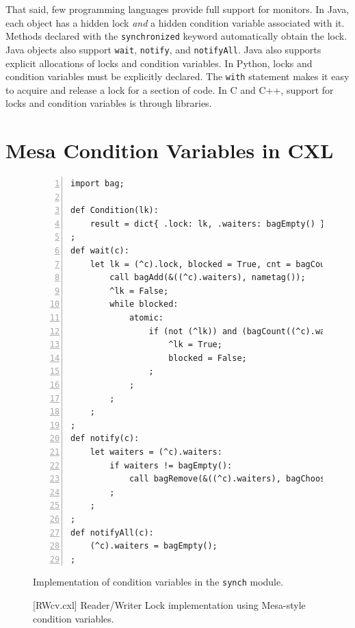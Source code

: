 \documentclass{report}
\newenvironment{code}{
\tcolorbox
}{
\endtcolorbox
}
\begin{document}
That said, few programming languages provide full support for monitors.
In Java, each object has a hidden lock \emph{and} a hidden condition variable
associated with it.
Methods declared with the \texttt{synchronized} keyword automatically
obtain the lock.  Java objects also support \texttt{wait}, \texttt{notify},
and \texttt{notifyAll}.  Java also supports explicit allocations of locks
and condition variables.
In Python, locks and condition variables must be explicitly declared.
The \texttt{with} statement makes it easy to acquire and release a lock
for a section of code.
In C and C++, support for locks and condition variables is through libraries.

\chapter{Mesa Condition Variables in CXL}
\label{ch:mesa}

\begin{figure}
\begin{code}
\begin{Verbatim}[xleftmargin=5mm,numbers=left]
import bag;

def Condition(lk):
    result = dict{ .lock: lk, .waiters: bagEmpty() };
;
def wait(c):
    let lk = (^c).lock, blocked = True, cnt = bagCount((^c).waiters, nametag()):
        call bagAdd(&((^c).waiters), nametag());
        ^lk = False;
        while blocked:
            atomic:
                if (not (^lk)) and (bagCount((^c).waiters, nametag()) <= cnt):
                    ^lk = True;
                    blocked = False;
                ;
            ;
        ;
    ;
;
def notify(c):
    let waiters = (^c).waiters:
        if waiters != bagEmpty():
            call bagRemove(&((^c).waiters), bagChoose(waiters));
        ;
    ;
;
def notifyAll(c):
    (^c).waiters = bagEmpty();
;
\end{Verbatim}
\end{code}
\caption{Implementation of condition variables in the \texttt{synch} module.}
\label{fig:cv}
\end{figure}

\begin{figure}
\begin{code}
\end{code}
\caption{[RWcv.cxl] Reader/Writer Lock implementation using Mesa-style condition variables.}
\label{fig:RWcv}
\end{figure}
\end{document}
